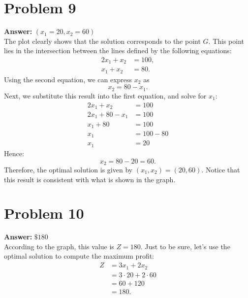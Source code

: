 \documentclass[11pt]{article}
\begin{document}
\section*{Problem 9}
\label{sec:orga030307}

\textbf{Answer:} \((x_1=20,x_2=60)\)\\

The plot clearly shows that the solution corresponds to the point \(G\). This
point lies in the intersection between the lines defined by the following
equations:
\begin{align*}
2x_1+x_2&=100,\\
x_1+x_2&=80.
\end{align*}
Using the second equation, we can express \(x_2\) as
\begin{equation*}
x_2=80-x_1.
\end{equation*}
Next, we substitute this result into the first equation, and solve for \(x_1\):
\begin{align*}
2x_1+x_2&=100\\
2x_1+80-x_1&=100\\
x_1+80&=100\\
x_1&=100-80\\
x_1&=20
\end{align*}
Hence:
\begin{equation*}
x_2=80-20=60.
\end{equation*}
Therefore, the optimal solution is given by \((x_1,x_2)=(20,60)\). Notice that
this result is consistent with what is shown in the graph.
\section*{Problem 10}
\label{sec:org431a886}

\textbf{Answer:} \(\$ 180\)\\

According to the graph, this value is \(Z=180\). Just to be sure, let's use
the optimal solution to compute the maximum profit:
\begin{align*}
Z&=3x_1+2x_2\\
&=3\cdot 20+2\cdot 60\\
&=60+120\\
&=180.
\end{align*}
\end{document}
